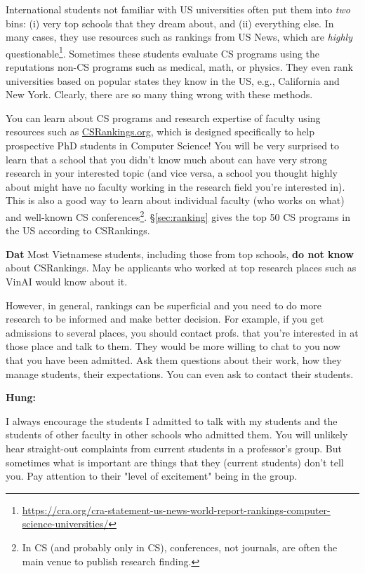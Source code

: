 \documentclass[11pt]{article}
\newenvironment{commentbox}[1][]{
\small
    \begin{cbox}
    \textbf{#1} 
 }{
   \end{cbox}
}
\begin{document}
International students not familiar with US universities often put them into \emph{two} bins:  (i) very top schools that they dream about, and (ii) everything else.  In many cases, they use resources such as rankings from US News, which are \emph{highly} questionable\footnote{\url{https://cra.org/cra-statement-us-news-world-report-rankings-computer-science-universities/}}.  Sometimes these students evaluate CS programs using the reputations non-CS programs such as medical, math, or physics.
They even rank universities based on popular states they know in the US, e.g., California and New York.  Clearly, there are so many thing wrong with these methods. 

You can learn about CS programs and research expertise of faculty using resources such as \href{https://csrankings.org}{CSRankings.org}, which is designed specifically to help prospective PhD students in Computer Science!  You will be very surprised to learn that a school that you didn't know much about can have very strong research in your interested topic (and vice versa, a school you thought highly about might have no faculty working in the research field you're interested in). This is also a good way to learn about individual faculty (who works on what) and well-known CS conferences\footnote{In CS (and probably only in CS), conferences, not journals, are often the main venue to publish research finding.}. \S\ref{sec:ranking} gives the top 50 CS programs in the US according to CSRankings.

\begin{commentbox}[Dat] Most Vietnamese students, including those from top schools, \textbf{do not know} about CSRankings.  May be applicants who worked at top research places such as VinAI would know about it.
\end{commentbox}

However, in general, rankings can be superficial and you need to do more research to be informed and make better decision. For example, if you get admissions to several places, you should contact profs. that you're interested in at those place and talk to them. They would be more willing to chat to you now that you have been admitted.  Ask them questions about their work, how they manage students, their expectations. You can even ask to contact their students.


\begin{commentbox}[Hung:]
I always encourage the students I admitted to talk with my students and the students of other faculty in other schools who admitted them. You will unlikely hear straight-out complaints from current students in a professor’s group. But sometimes what is important are things that they (current students) don’t tell you. Pay attention to their "level of excitement" being in the group.
\end{commentbox}
\end{document}
